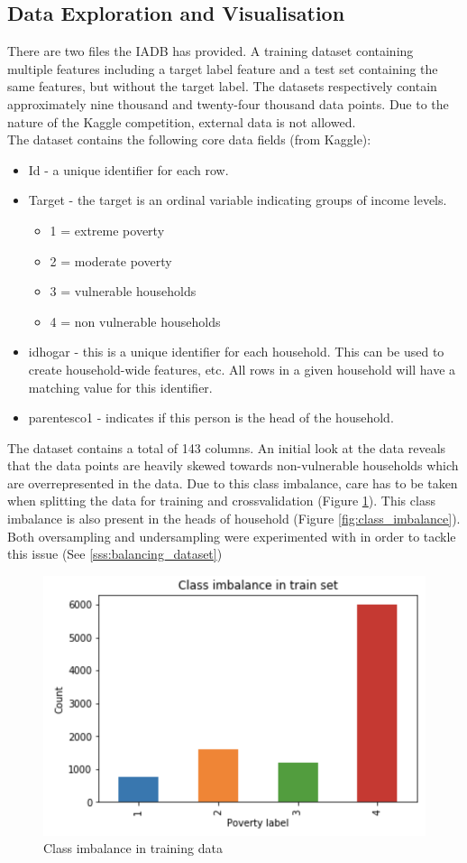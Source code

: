 \documentclass[preprint,12pt]{elsarticle}
\begin{document}
\subsection{Data Exploration and Visualisation}
There are two files the IADB has provided. A training dataset containing multiple features including a target label feature and a test set containing the same features, but without the target label. The datasets respectively contain approximately nine thousand and twenty-four thousand data points. Due to the nature of the Kaggle competition, external data is not allowed.\\
The dataset contains the following core data fields (from Kaggle):
\begin{itemize}
\item Id - a unique identifier for each row.
\item Target - the target is an ordinal variable indicating groups of income levels.
\begin{itemize}
\item 1 = extreme poverty
\item 2 = moderate poverty
\item 3 = vulnerable households
\item 4 = non vulnerable households
\end{itemize}
\item idhogar - this is a unique identifier for each household. This can be used to create household-wide features, etc. All rows in
a given household will have a matching value for this identifier.
\item parentesco1 - indicates if this person is the head of the household.
\end{itemize}
The dataset contains a total of 143 columns.
An initial look at the data reveals that the data points are heavily skewed towards non-vulnerable households which are overrepresented in the data. Due to this class imbalance, care has to be taken when splitting the data for training and crossvalidation (Figure \ref{fig:class_imbalance_full}). This class imbalance is also present in the heads of household (Figure \ref{fig:class_imbalance}). Both oversampling and undersampling were experimented with in order to tackle this issue (See \ref{sss:balancing_dataset})

\begin{figure}[h!]
\centering\includegraphics[width=0.8\linewidth]{class_imbalance_full}
\caption{Class imbalance in training data}
\label{fig:class_imbalance_full}
\end{figure}
\end{document}
